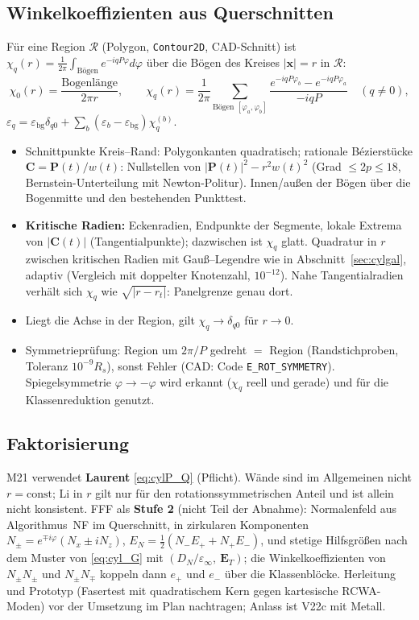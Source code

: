 \subsection{Winkelkoeffizienten aus Querschnitten}
Für eine Region $\mathcal R$ (Polygon, \verb|Contour2D|, CAD-Schnitt) ist $\chi_q(r)=\frac1{2\pi}\int_{\text{Bögen}}e^{-iqP\varphi}d\varphi$
über die Bögen des Kreises $|\mathbf x|=r$ in $\mathcal R$:
\begin{equation}
  \chi_0(r)=\frac{\text{Bogenlänge}}{2\pi r},\qquad
  \chi_q(r)=\frac1{2\pi}\sum_{\text{Bögen }[\varphi_a,\varphi_b]}\frac{e^{-iqP\varphi_b}-e^{-iqP\varphi_a}}{-iqP}\quad(q\ne0),
  \label{eq:cylP_chi}
\end{equation}
$\varepsilon_q=\varepsilon_{\text{bg}}\delta_{q0}+\sum_b(\varepsilon_b-\varepsilon_{\text{bg}})\chi^{(b)}_q$.
\begin{itemize}[nosep]
  \item Schnittpunkte Kreis--Rand: Polygonkanten quadratisch; rationale Bézierstücke $\mathbf C=\mathbf P(t)/w(t)$:
        Nullstellen von $|\mathbf P(t)|^2-r^2w(t)^2$ (Grad $\le2p\le18$, Bernstein-Unterteilung mit Newton-Politur). Innen/außen
        der Bögen über die Bogenmitte und den bestehenden Punkttest.
  \item \textbf{Kritische Radien:} Eckenradien, Endpunkte der Segmente, lokale Extrema von $|\mathbf C(t)|$ (Tangentialpunkte);
        dazwischen ist $\chi_q$ glatt. Quadratur in $r$ zwischen kritischen Radien mit Gauß--Legendre wie in
        Abschnitt~\ref{sec:cylgal}, adaptiv (Vergleich mit doppelter Knotenzahl, $10^{-12}$). Nahe Tangentialradien
        verhält sich $\chi_q$ wie $\sqrt{|r-r_t|}$: Panelgrenze genau dort.
  \item Liegt die Achse in der Region, gilt $\chi_q\to\delta_{q0}$ für $r\to0$.
  \item Symmetrieprüfung: Region um $2\pi/P$ gedreht $=$ Region (Randstichproben, Toleranz $10^{-9}R_s$), sonst Fehler
        (CAD: Code \verb|E_ROT_SYMMETRY|). Spiegelsymmetrie $\varphi\to-\varphi$ wird erkannt ($\chi_q$ reell und gerade) und
        für die Klassenreduktion genutzt.
\end{itemize}

\subsection{Faktorisierung}
M21 verwendet \textbf{Laurent} \eqref{eq:cylP_Q} (Pflicht). Wände sind im Allgemeinen nicht $r=\text{const}$; Li in $r$
gilt nur für den rotationssymmetrischen Anteil und ist allein nicht konsistent. FFF als \textbf{Stufe 2} (nicht Teil der
Abnahme): Normalenfeld aus Algorithmus~NF im Querschnitt, in zirkularen Komponenten
$N_\pm=e^{\mp i\varphi}(N_x\pm iN_z)$, $E_N=\tfrac12(N_-E_++N_+E_-)$, und stetige Hilfsgrößen nach dem Muster von
\eqref{eq:cyl_G} mit $(D_N/\varepsilon_\infty,\ \mathbf E_T)$; die Winkelkoeffizienten von $N_\pm N_\pm$ und $N_\pm N_\mp$
koppeln dann $e_+$ und $e_-$ über die Klassenblöcke. Herleitung und Prototyp (Fasertest mit quadratischem Kern gegen
kartesische RCWA-Moden) vor der Umsetzung im Plan nachtragen; Anlass ist V22c mit Metall.

